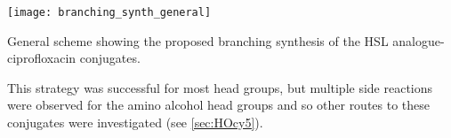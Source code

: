 \begin{scheme}[H]
	\begin{center}
		\texttt{[image: branching\_synth\_general]}
		\caption{General scheme showing the proposed branching synthesis of the HSL analogue-ciprofloxacin conjugates.\label{sch:branching_synth_general}}
	\end{center}
\end{scheme}

This strategy was successful for most head groups, but multiple side reactions were observed for the amino alcohol head groups and so other routes to these conjugates were investigated (see \ref{sec:HOcy5}).
